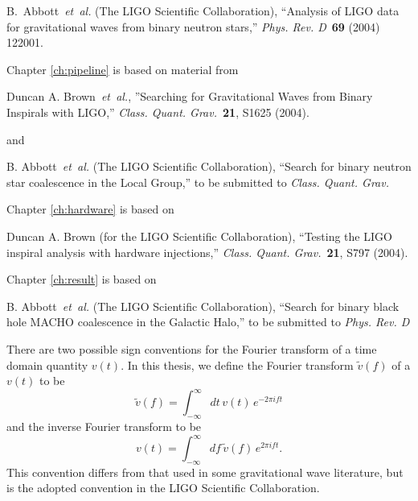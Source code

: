 \documentclass[12pt,notitlepage]{report}
\newcommand{\cqg}{{\it Class. Quant. Grav.}}
\newcommand{\prd}{{\it Phys. Rev. D}}
\begin{document}
\vspace*{0.25cm}

\noindent B.~Abbott~{\it et~al.} (The LIGO Scientific Collaboration),
``Analysis of LIGO data for gravitational waves from binary neutron stars,''
\prd~{\bf 69} (2004) 122001.

\vspace*{0.5cm}

\noindent Chapter \ref{ch:pipeline} is based on material from

\vspace*{0.25cm}

\noindent Duncan A. Brown~{\it et~al.}, ''Searching for Gravitational Waves
from Binary Inspirals with LIGO,'' \cqg~{\bf 21}, S1625 (2004).

\vspace*{0.25cm}

\noindent and

\vspace*{0.25cm}

\noindent B. Abbott~{\it et~al.} (The LIGO Scientific Collaboration), ``Search
for binary neutron star coalescence in the Local Group,'' to be submitted to
\cqg

\vspace*{0.5cm}

\noindent Chapter \ref{ch:hardware} is based on 

\vspace*{0.25cm}

\noindent Duncan A. Brown (for the LIGO Scientific Collaboration), ``Testing
the LIGO inspiral analysis with hardware injections,'' \cqg~{\bf 21}, S797
(2004).

\vspace*{0.5cm}

\noindent Chapter \ref{ch:result} is based on

\vspace*{0.25cm}

\noindent B. Abbott~{\it et~al.} (The LIGO Scientific Collaboration), ``Search
for binary black hole MACHO coalescence in the Galactic Halo,'' to be
submitted to \prd




There are two possible sign conventions for the Fourier transform of a time
domain quantity $v(t)$. In this thesis, we define the Fourier transform
$\tilde{v}(f)$ of a $v(t)$ to be
\begin{equation*}
\tilde{v}(f)=\int_{-\infty}^\infty dt\,v(t)\, e^{- 2 \pi i f t}
\end{equation*}
and the inverse Fourier transform to be 
\begin{equation*}
v(t)=\int_{-\infty}^\infty df\,\tilde{v}(f)\, e^{2 \pi i f t}.
\end{equation*}
This convention differs from that used in some gravitational wave literature,
but is the adopted convention in the LIGO Scientific Collaboration.
\end{document}
